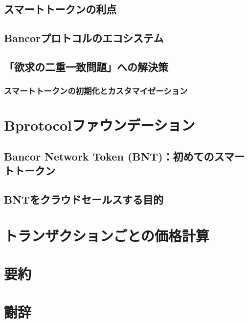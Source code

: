 \documentclass{jsarticle}
\begin{document}
  \subsection{スマートトークンの利点}



  \subsection{Bancorプロトコルのエコシステム}



  \subsection{「欲求の二重一致問題」への解決策}



    \subsubsection{スマートトークンの初期化とカスタマイゼーション}



\section{Bprotocolファウンデーション}



  \subsection{Bancor Network Token (BNT)：初めてのスマートトークン}



  \subsection{BNTをクラウドセールスする目的}



\section{トランザクションごとの価格計算}



\section{要約}



\section{謝辞}
\end{document}
